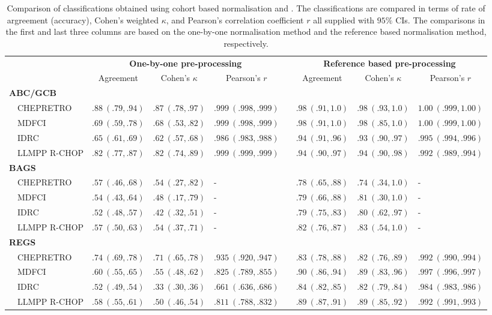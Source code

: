 \begin{table}[!tbp]
{\scriptsize
\caption{Comparison of classifications obtained using cohort based
normalisation and \hemaClass{}.
The classifications are compared in terms of rate of argreement (accuracy),
Cohen's weighted $\kappa$, and Pearson's correlation coefficient $r$ all
supplied with $95\%$ CIs. The comparisons in the first and last three columns
are based on the one-by-one normalisation method and the reference based
normalisation method, respectively.\label{tab:classALL}} 
\begin{center}
\begin{tabular}{llllclll}
\hline\hline
\multicolumn{1}{l}{\bfseries }&\multicolumn{3}{c}{\bfseries One-by-one pre-processing}&\multicolumn{1}{c}{\bfseries }&\multicolumn{3}{c}{\bfseries Reference based pre-processing}\tabularnewline
\cline{2-4} \cline{6-8}
\multicolumn{1}{l}{}&\multicolumn{1}{c}{Agreement}&\multicolumn{1}{c}{Cohen's $\kappa$}&\multicolumn{1}{c}{Pearson's $r$}&\multicolumn{1}{c}{}&\multicolumn{1}{c}{Agreement}&\multicolumn{1}{c}{Cohen's $\kappa$}&\multicolumn{1}{c}{Pearson's $r$}\tabularnewline
\hline
{\bfseries ABC/GCB}&&&&&&&\tabularnewline
~~CHEPRETRO&$.88~(.79, .94)$&$.87~(.78, .97)$&$.999~(.998, .999)$&&$.98~(.91, 1.0)$&$.98~(.93, 1.0)$&$1.00~(.999, 1.00)$\tabularnewline
~~MDFCI&$.69~(.59, .78)$&$.68~(.53, .82)$&$.999~(.998, .999)$&&$.98~(.91, 1.0)$&$.98~(.85, 1.0)$&$1.00~(.999, 1.00)$\tabularnewline
~~IDRC&$.65~(.61, .69)$&$.62~(.57, .68)$&$.986~(.983, .988)$&&$.94~(.91, .96)$&$.93~(.90, .97)$&$.995~(.994, .996)$\tabularnewline
~~LLMPP R-CHOP&$.82~(.77, .87)$&$.82~(.74, .89)$&$.999~(.999, .999)$&&$.94~(.90, .97)$&$.94~(.90, .98)$&$.992~(.989, .994)$\tabularnewline
\hline
{\bfseries BAGS}&&&&&&&\tabularnewline
~~CHEPRETRO&$.57~(.46, .68)$&$.54~(.27, .82)$&-&&$.78~(.65, .88)$&$.74~(.34, 1.0)$&-\tabularnewline
~~MDFCI&$.54~(.43, .64)$&$.48~(.17, .79)$&-&&$.79~(.66, .88)$&$.81~(.30, 1.0)$&-\tabularnewline
~~IDRC&$.52~(.48, .57)$&$.42~(.32, .51)$&-&&$.79~(.75, .83)$&$.80~(.62, .97)$&-\tabularnewline
~~LLMPP R-CHOP&$.57~(.50, .63)$&$.54~(.37, .71)$&-&&$.82~(.76, .87)$&$.83~(.54, 1.0)$&-\tabularnewline
\hline
{\bfseries REGS}&&&&&&&\tabularnewline
~~CHEPRETRO&$.74~(.69, .78)$&$.71~(.65, .78)$&$.935~(.920, .947)$&&$.83~(.78, .88)$&$.82~(.76, .89)$&$.992~(.990, .994)$\tabularnewline
~~MDFCI&$.60~(.55, .65)$&$.55~(.48, .62)$&$.825~(.789, .855)$&&$.90~(.86, .94)$&$.89~(.83, .96)$&$.997~(.996, .997)$\tabularnewline
~~IDRC&$.52~(.49, .54)$&$.33~(.30, .36)$&$.661~(.636, .686)$&&$.84~(.82, .85)$&$.82~(.79, .84)$&$.984~(.983, .986)$\tabularnewline
~~LLMPP R-CHOP&$.58~(.55, .61)$&$.50~(.46, .54)$&$.811~(.788, .832)$&&$.89~(.87, .91)$&$.89~(.85, .92)$&$.992~(.991, .993)$\tabularnewline
\hline
\end{tabular}\end{center}}

\end{table}
